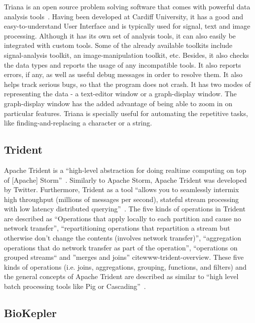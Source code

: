 Triana is an open source problem solving software that comes with
powerful data analysis tools~\cite{trianaDocumentation-1}.  Having
been developed at Cardiff University, it has a good and
easy-to-understand User Interface and is typically used for signal,
text and image processing.  Although it has its own set of analysis
tools, it can also easily be integrated with custom tools.  Some of
the already available toolkits include signal-analysis toolkit, an
image-manipulation toolkit, etc.  Besides, it also checks the data
types and reports the usage of any incompatible tools.  It also
reports errors, if any, as well as useful debug messages in order to
resolve them.  It also helps track serious bugs, so that the program
does not crash.  It has two modes of representing the data - a
text-editor window or a graph-display window.  The graph-display
window has the added advantage of being able to zoom in on particular
features.  Triana is specially useful for automating the repetitive
tasks, like finding-and-replacing a character or a string.
   
\subsection{Trident}

Apache Trident is a ``high-level abstraction for doing realtime
computing on top of [Apache]
Storm''~\cite{www-trident-tutorial}. Similarly to Apache Storm, Apache
Trident was developed by Twitter.  Furthermore, Trident as a tool
``allows you to seamlessly intermix high throughput (millions of
messages per second), stateful stream processing with low latency
distributed querying''~\cite{www-trident-tutorial}.  The five kinds of
operations in Trident are described as ``Operations that apply locally
to each partition and cause no network transfer'', ``repartitioning
operations that repartition a stream but otherwise don't change the
contents (involves network transfer)'', ``aggregation operations that
do network transfer as part of the operation'', ``operations on
grouped streams`` and ''merges and joins'' cite{www-trident-overview}.
These five kinds of operations (i.e. joins, aggregations, grouping,
functions, and filters) and the general concepts of Apache Trident are
described as similar to ``high level batch processing tools like Pig
or Cascading''~\cite{www-trident-tutorial}.

\pv

\subsection{BioKepler}
    
